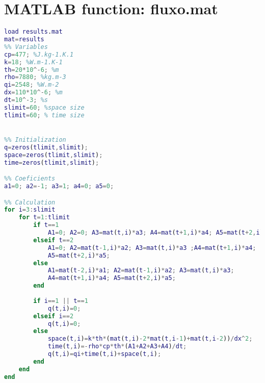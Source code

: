 \chapter{MATLAB function: fluxo.mat}
\label{ap:c}
\begin{lstlisting}[language=matlab]
load results.mat
mat=results
%% Variables
cp=477; %J.kg-1.K.1
k=18; %W.m-1.K-1
th=20*10^-6; %m
rho=7880; %kg.m-3
qi=2548; %W.m-2
dx=110*10^-6; %m
dt=10^-3; %s
slimit=60; %space size
tlimit=60; % time size


%% Initialization
q=zeros(tlimit,slimit);
space=zeros(tlimit,slimit);
time=zeros(tlimit,slimit);

%% Coeficients
a1=0; a2=-1; a3=1; a4=0; a5=0;

%% Calculation
for i=3:slimit
    for t=1:tlimit
        if t==1
            A1=0; A2=0; A3=mat(t,i)*a3; A4=mat(t+1,i)*a4; A5=mat(t+2,i)*a5;
        elseif t==2
            A1=0; A2=mat(t-1,i)*a2; A3=mat(t,i)*a3 ;A4=mat(t+1,i)*a4; 
            A5=mat(t+2,i)*a5;
        else
            A1=mat(t-2,i)*a1; A2=mat(t-1,i)*a2; A3=mat(t,i)*a3; 
            A4=mat(t+1,i)*a4; A5=mat(t+2,i)*a5;
        end
        
        if i==1 || t==1
            q(t,i)=0;
        elseif i==2
            q(t,i)=0;
        else
            space(t,i)=k*th*(mat(t,i)-2*mat(t,i-1)+mat(t,i-2))/dx^2;
            time(t,i)=-rho*cp*th*(A1+A2+A3+A4)/dt;
            q(t,i)=qi+time(t,i)+space(t,i);
        end
    end
end
\end{lstlisting}